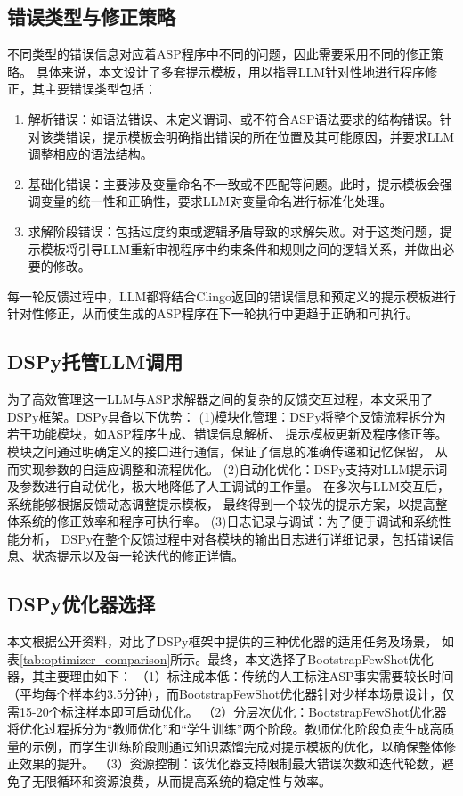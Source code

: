 \subsection{错误类型与修正策略}
不同类型的错误信息对应着ASP程序中不同的问题，因此需要采用不同的修正策略。
具体来说，本文设计了多套提示模板，用以指导LLM针对性地进行程序修正，其主要错误类型包括：
\begin{enumerate}
    \item 解析错误：如语法错误、未定义谓词、或不符合ASP语法要求的结构错误。针对该类错误，提示模板会明确指出错误的所在位置及其可能原因，并要求LLM调整相应的语法结构。
    \item 基础化错误：主要涉及变量命名不一致或不匹配等问题。此时，提示模板会强调变量的统一性和正确性，要求LLM对变量命名进行标准化处理。
    \item 求解阶段错误：包括过度约束或逻辑矛盾导致的求解失败。对于这类问题，提示模板将引导LLM重新审视程序中约束条件和规则之间的逻辑关系，并做出必要的修改。
\end{enumerate}
每一轮反馈过程中，LLM都将结合Clingo返回的错误信息和预定义的提示模板进行针对性修正，从而使生成的ASP程序在下一轮执行中更趋于正确和可执行。
\subsection{DSPy托管LLM调用}
为了高效管理这一LLM与ASP求解器之间的复杂的反馈交互过程，本文采用了DSPy框架。DSPy具备以下优势：
(1)模块化管理：DSPy将整个反馈流程拆分为若干功能模块，如ASP程序生成、错误信息解析、
提示模板更新及程序修正等。模块之间通过明确定义的接口进行通信，保证了信息的准确传递和记忆保留，
从而实现参数的自适应调整和流程优化。
(2)自动化优化：DSPy支持对LLM提示词及参数进行自动优化，极大地降低了人工调试的工作量。
在多次与LLM交互后，系统能够根据反馈动态调整提示模板，
最终得到一个较优的提示方案，以提高整体系统的修正效率和程序可执行率。
(3)日志记录与调试：为了便于调试和系统性能分析，
DSPy在整个反馈过程中对各模块的输出日志进行详细记录，包括错误信息、状态提示以及每一轮迭代的修正详情。
\subsection{DSPy优化器选择}
本文根据公开资料，对比了DSPy框架中提供的三种优化器的适用任务及场景，
如表\ref{tab:optimizer_comparison}所示。最终，本文选择了BootstrapFewShot优化器，其主要理由如下：
（1）标注成本低：传统的人工标注ASP事实需要较长时间（平均每个样本约3.5分钟），而BootstrapFewShot优化器针对少样本场景设计，仅需15-20个标注样本即可启动优化。
（2）分层次优化：BootstrapFewShot优化器将优化过程拆分为“教师优化”和“学生训练”两个阶段。教师优化阶段负责生成高质量的示例，而学生训练阶段则通过知识蒸馏完成对提示模板的优化，以确保整体修正效果的提升。
（3）资源控制：该优化器支持限制最大错误次数和迭代轮数，避免了无限循环和资源浪费，从而提高系统的稳定性与效率。

